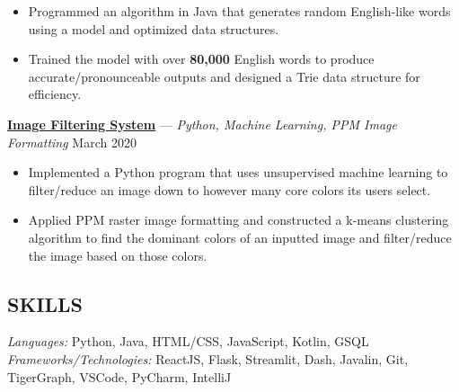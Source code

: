 \documentclass[11pt]{res}
\begin{document}
\begin{footnotesize}
\begin{resume}
\begin{itemize} \itemsep -2pt 
\item Programmed an algorithm in Java that generates random English-like words using a model and optimized data structures.  
\vspace{-2.5mm}
\item Trained the model with over \textbf{80,000} English words to produce accurate/pronounceable outputs and designed a Trie data structure for efficiency.
\end{itemize}
\vspace{-2.5mm}
\href{https://github.com/CharlesShi12/ImageFilters}{\textbf{Image Filtering System}} — {\sl Python, Machine Learning, PPM Image Formatting} \hfill March 2020\vspace{-4.75mm}
\begin{itemize} \itemsep -2pt
\item Implemented a Python program that uses unsupervised machine learning to filter/reduce an image down to however many core colors its users select.
\vspace{1mm}
\item Applied PPM raster image formatting and constructed a k-means clustering algorithm to find the dominant colors of an inputted image and filter/reduce the image based on those colors. 
\end{itemize}
\begin{small}
\section{SKILLS}
\end{small} 
\vspace{.5mm}
{\sl Languages:} 
Python, Java, HTML/CSS, JavaScript, Kotlin, GSQL \\
{\sl Frameworks/Technologies:} ReactJS, Flask, Streamlit, Dash, Javalin, Git, TigerGraph, VSCode, PyCharm, IntelliJ

\end{resume}
\end{footnotesize}
\end{document}
